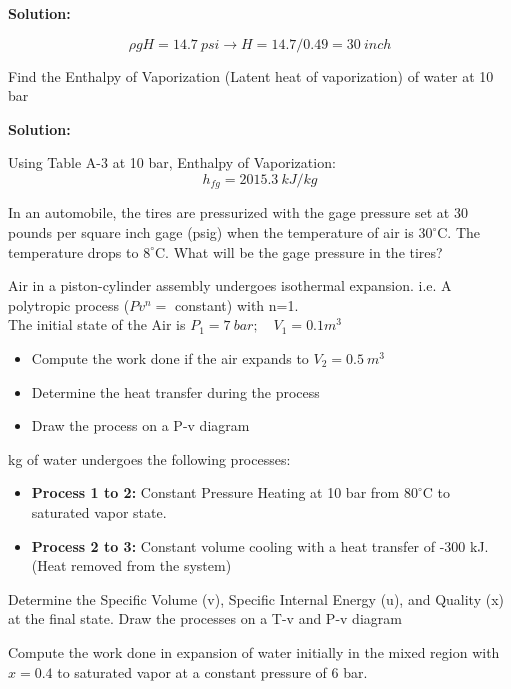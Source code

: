 \documentclass[12pt]{exam}
\begin{document}
\begin{questions}
		\textbf{Solution: }

		$$\rho gH=14.7\ psi\to H=14.7/0.49 = 30\ inch$$
		
			\question[3] Find the Enthalpy of Vaporization (Latent heat of vaporization) of water at 10 bar

				\textbf{Solution: }

				Using Table A-3 at 10 bar, Enthalpy of Vaporization:
				$$h_{fg}=2015.3\ kJ/kg$$
				
		\question[12] In an automobile, the tires are pressurized with the gage pressure set at 30 pounds per square inch gage (psig) when the temperature of air is $30^\circ\text{C}$. The temperature drops to $8^\circ\text{C}$. What will be the gage pressure in the tires?
		
		\question[10] Air in a piston-cylinder assembly undergoes isothermal expansion. i.e. A polytropic process ($Pv^n=$ constant) with n=1. \\
		The initial state of the Air is $P_1=7\ bar ;\quad V_1=0.1 m^3$ 
		\begin{itemize}
			\item Compute the work done if the air expands to $V_2=0.5\ m^3$
			\item Determine the heat transfer during the process
			\item Draw the process on a P-v diagram
		\end{itemize}

		
		 kg of water undergoes the following processes:
		\begin{itemize}
			\item \textbf{Process 1 to 2:} Constant Pressure Heating at 10 bar from $80^\circ\text{C}$ to saturated vapor state.
			\item \textbf{Process 2 to 3:} Constant volume cooling with a heat transfer of -300 kJ. (Heat removed from the system)
		\end{itemize}
		
		
		Determine the Specific Volume (v), Specific Internal Energy (u), and Quality (x) at the final state. Draw the processes on a T-v and P-v diagram
		
		\question[10] Compute the work done in expansion of water initially in the mixed region with $x=0.4$ to saturated vapor at a constant pressure of 6 bar.
		

\end{questions}
\end{document}
